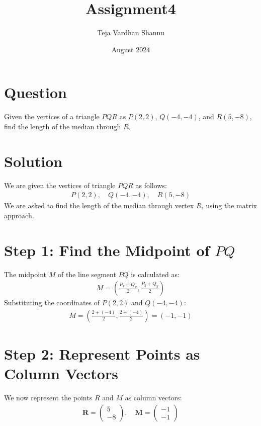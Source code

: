 \documentclass[journal]{IEEEtran}
\title{Assignment4}
\author{Teja Vardhan Shannu}
\date{August 2024}
\numberwithin{equation}{enumi}
\numberwithin{figure}{enumi}
\begin{document}
\maketitle

\section*{Question}
Given the vertices of a triangle \( PQR \) as \( P(2, 2) \), \( Q(-4, -4) \), and \( R(5, -8) \), find the length of the median through \( R \).

\section*{Solution}

We are given the vertices of triangle \( PQR \) as follows:
\begin{align}
P(2, 2), \quad Q(-4, -4), \quad R(5, -8)
\end{align}
We are asked to find the length of the median through vertex \( R \), using the matrix approach.

\section*{Step 1: Find the Midpoint of \( PQ \)}
The midpoint \( M \) of the line segment \( PQ \) is calculated as:
\begin{align}
M = \left( \frac{P_x + Q_x}{2}, \frac{P_y + Q_y}{2} \right)
\end{align}
Substituting the coordinates of \( P(2, 2) \) and \( Q(-4, -4) \):
\begin{align}
M = \left( \frac{2 + (-4)}{2}, \frac{2 + (-4)}{2} \right) = (-1, -1)
\end{align}

\section*{Step 2: Represent Points as Column Vectors}

We now represent the points \( R \) and \( M \) as column vectors:
\begin{align}
\mathbf{R} = \begin{pmatrix} 5 \\ -8 \end{pmatrix}, \quad \mathbf{M} = \begin{pmatrix} -1 \\ -1 \end{pmatrix}
\end{align}
\end{document}
